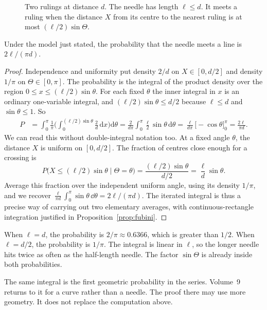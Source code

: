 \begin{figure}[ht]
\centering
{}
\caption{Two rulings at distance $d$. The needle has length $\ell\le d$. It meets a ruling when the distance $X$ from its centre to the nearest ruling is at most $(\ell/2)\sin\Theta$.}
\label{fig:buffon}
\end{figure}

\begin{theorem}\label{thm:buffon}
Under the model just stated, the probability that the needle meets a line is $2\ell/(\pi d)$.
\end{theorem}
\begin{proof}
Independence and uniformity put density $2/d$ on $X\in[0,d/2]$ and density $1/\pi$ on $\Theta\in[0,\pi]$. The probability is the integral of the product density over the region $0\le x\le(\ell/2)\sin\theta$. For each fixed $\theta$ the inner integral in $x$ is an ordinary one-variable integral, and $(\ell/2)\sin\theta\le d/2$ because $\ell\le d$ and $\sin\theta\le1$. So
\begin{align*}
P
&=\int_0^\pi\frac1\pi\Biggl(\int_0^{(\ell/2)\sin\theta}\frac2d\,\mathrm dx\Biggr)\mathrm d\theta
=\frac{2}{d\pi}\int_0^\pi\frac\ell2\sin\theta\,\mathrm d\theta
=\frac{\ell}{d\pi}\bigl[-\cos\theta\bigr]_0^\pi
=\frac{2\ell}{\pi d}.
\end{align*}
We can read this without double-integral notation too. At a fixed angle $\theta$, the distance $X$ is uniform on $[0,d/2]$. The fraction of centres close enough for a crossing is
\[
 P\bigl(X\le(\ell/2)\sin\theta\mid\Theta=\theta\bigr)
 =\frac{(\ell/2)\sin\theta}{d/2}
 =\frac{\ell}{d}\sin\theta.
\]
Average this fraction over the independent uniform angle, using its density $1/\pi$, and we recover $\frac{\ell}{\pi d}\int_0^\pi\sin\theta\,\dd\theta=2\ell/(\pi d)$. The iterated integral is thus a precise way of carrying out two elementary averages, with continuous-rectangle integration justified in Proposition~\ref{prop:fubini}.
\end{proof}

When $\ell=d$, the probability is $2/\pi\approx0.6366$, which is greater than $1/2$. When $\ell=d/2$, the probability is $1/\pi$. The integral is linear in $\ell$, so the longer needle hits twice as often as the half-length needle. The factor $\sin\Theta$ is already inside both probabilities.

The same integral is the first geometric probability in the series. Volume~9 returns to it for a curve rather than a needle. The proof there may use more geometry. It does not replace the computation above.
